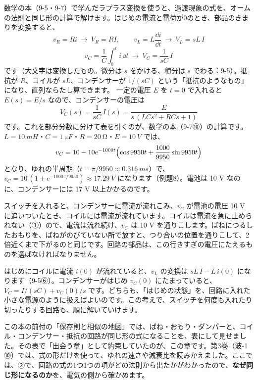 \label{ph:電-9:sec8}
数学の本（9-5・9-7）で学んだラプラス変換を使うと、過渡現象の式を、オームの法則と同じ形の計算で解けます。はじめの電流と電荷が0のとき、部品のきまりを変換すると、
\[ v_R=Ri\ \to\ V_R=RI,\qquad v_L=L\frac{\dd i}{\dd t}\ \to\ V_L=sL\,I \]
\[ v_C=\frac{1}{C}\int_0^t i\,\dd t\ \to\ V_C=\frac{1}{sC}\,I \]
です（大文字は変換したもの。微分は $s$ をかける、積分は $s$ でわる：9-5）。抵抗が $R$、コイルが $sL$、コンデンサーが $1/(sC)$ という「抵抗のようなもの」になり、直列ならたし算できます。
\label{ph:電-9:laplace}一定の電圧 $E$ を $t=0$ で入れると $E(s)=E/s$ なので、コンデンサーの電圧は
\[ V_C(s)=\frac{1}{sC}\,I(s)=\frac{E}{s\,(LCs^2+RCs+1)} \]
です。これを部分分数に分けて表を引くのが、数学の本（9-7⑩）の計算です。$L=\qty{10}{mH}$・$C=\qty{1}{\micro F}$・$R=\qty{20}{\ohm}$・$E=\qty{10}{V}$ では、
\[ v_C=10-10e^{-1000t}\Bigl(\cos9950t+\frac{1000}{9950}\sin9950t\Bigr) \]
となり、ゆれの半周期（$t=\pi/9950\approx\qty{0.316}{ms}$）で、$v_C=10\,(1+e^{-1000\pi/9950})\approx\qty{17.29}{V}$ になります（例題8）。電池は 10 V なのに、コンデンサーには 17 V 以上かかるのです。

\begin{phyomi}[電池より高い電圧が出るわけ]
スイッチを入れると、コンデンサーに電流が流れこみ、$v_C$ が電池の電圧 10 V に追いついたとき、コイルには電流が流れています。コイルは電流を急に止められない（①）ので、電流は流れ続け、$v_C$ は 10 V を通りこします。ばねにつるしたおもりを、ばねがのびていない所で放すと、つり合いの位置を通りこして、2倍近くまで下がるのと同じです。回路の部品は、この行きすぎの電圧にたえるものを選ばなければなりません。
\end{phyomi}

はじめにコイルに電流 $i(0)$ が流れていると、$v_L$ の変換は $sL\,I-L\,i(0)$ になります（9-5⑥）。コンデンサーがはじめ $v_C(0)$ にたまっていると、$V_C=I/(sC)+v_C(0)/s$ です。どちらも、「はじめの状態」を、回路に入れた小さな電源のように扱えばよいのです。この考えで、スイッチを何度も入れたり切ったりする回路も、順に解いていけます。

\label{ph:電-9:sec9}
この本の前付の「保存則と相似の地図」では、ばね・おもり・ダンパーと、コイル・コンデンサー・抵抗の回路が同じ形の式になることを、表にして見せました。その表で「出会う章」として約束していたのが、この章です。第3巻（波-1 ⑩）では、式の形だけを使って、ゆれの速さや減衰比を読みかえました。ここでは、②で、回路の式の1つ1つの項がどの法則から出たかがわかったので、\textbf{なぜ同じ形になるのか}を、電気の側から確かめます。

